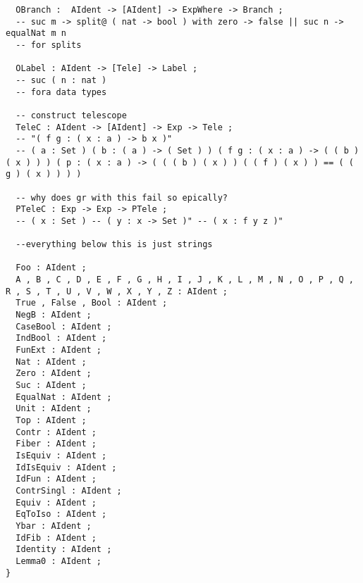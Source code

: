 \begin{verbatim}
  OBranch :  AIdent -> [AIdent] -> ExpWhere -> Branch ;
  -- suc m -> split@ ( nat -> bool ) with zero -> false || suc n -> equalNat m n
  -- for splits

  OLabel : AIdent -> [Tele] -> Label ;
  -- suc ( n : nat )
  -- fora data types

  -- construct telescope
  TeleC : AIdent -> [AIdent] -> Exp -> Tele ;
  -- "( f g : ( x : a ) -> b x )"
  -- ( a : Set ) ( b : ( a ) -> ( Set ) ) ( f g : ( x : a ) -> ( ( b ) ( x ) ) ) ( p : ( x : a ) -> ( ( ( b ) ( x ) ) ( ( f ) ( x ) ) == ( ( g ) ( x ) ) ) )

  -- why does gr with this fail so epically?
  PTeleC : Exp -> Exp -> PTele ; 
  -- ( x : Set ) -- ( y : x -> Set )" -- ( x : f y z )"

  --everything below this is just strings

  Foo : AIdent ;
  A , B , C , D , E , F , G , H , I , J , K , L , M , N , O , P , Q , R , S , T , U , V , W , X , Y , Z : AIdent ;
  True , False , Bool : AIdent ;
  NegB : AIdent ;
  CaseBool : AIdent ;
  IndBool : AIdent ;
  FunExt : AIdent ;
  Nat : AIdent ;
  Zero : AIdent ;
  Suc : AIdent ;
  EqualNat : AIdent ;
  Unit : AIdent ;
  Top : AIdent ;
  Contr : AIdent ;
  Fiber : AIdent ;
  IsEquiv : AIdent ;
  IdIsEquiv : AIdent ;
  IdFun : AIdent ;
  ContrSingl : AIdent ;
  Equiv : AIdent ;
  EqToIso : AIdent ;
  Ybar : AIdent ;
  IdFib : AIdent ;
  Identity : AIdent ;
  Lemma0 : AIdent ;
}
\end{verbatim}
